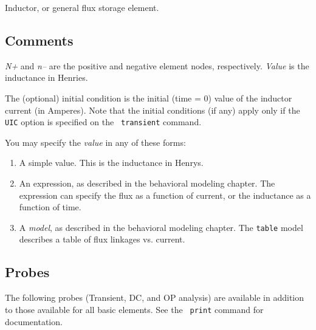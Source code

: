 Inductor, or general flux storage element.
\subsection{Comments}

{\it N+} and {\it n--} are the positive and negative element nodes,
respectively.  {\it Value} is the inductance in Henries.

The (optional) initial condition is the initial (time = 0) value of
the inductor current (in Amperes).  Note that the initial conditions
(if any) apply only if the {\tt UIC} option is specified on the {\tt
transient} command.

You may specify the {\it value} in any of these forms:

\begin{enumerate}
  
\item
A simple value.  This is the inductance in Henrys.
  
\item
An expression, as described in the behavioral modeling chapter.  The
expression can specify the flux as a function of current, or the
inductance as a function of time.

\item
A {\it model}, as described in the behavioral modeling chapter.  The
{\tt table} model describes a table of flux linkages vs. current.

\end{enumerate}
\subsection{Probes}

The following probes (Transient, DC, and OP analysis) are available in
addition to those available for all basic elements.  See the {\tt
print} command for documentation.

